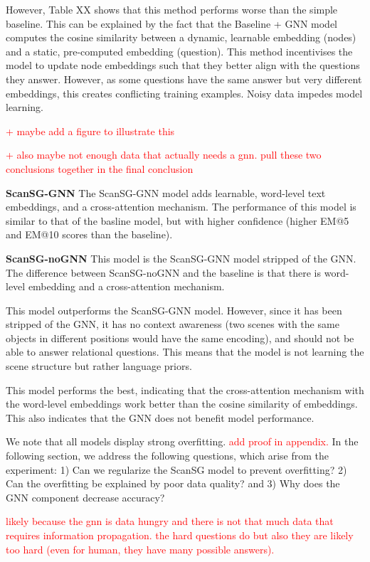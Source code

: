 However, Table XX shows that this method performs worse than the simple baseline. This can be explained by the fact that the Baseline + GNN model computes the cosine similarity between a dynamic, learnable embedding (nodes) and a static, pre-computed embedding (question). This method incentivises the model to update node embeddings such that they better align with the questions they answer. However, as some questions have the same answer but very different embeddings, this creates conflicting training examples. Noisy data impedes model learning.

\textcolor{red}{+ maybe add a figure to illustrate this}

\textcolor{red}{+ also maybe not enough data that actually needs a gnn. pull these two conclusions together in the final conclusion}

\bigskip \noindent
\textbf{ScanSG-GNN}
The ScanSG-GNN model adds learnable, word-level text embeddings, and a cross-attention mechanism. The performance of this model is similar to that of the basline model, but with higher confidence (higher EM@5 and EM@10 scores than the baseline).

\bigskip \noindent
\textbf{ScanSG-noGNN}
This model is the ScanSG-GNN model stripped of the GNN. The difference between ScanSG-noGNN and the baseline is that there is word-level embedding and a cross-attention mechanism.

This model outperforms the ScanSG-GNN model. However, since it has been stripped of the GNN, it has no context awareness (two scenes with the same objects in different positions would have the same encoding), and should not be able to answer relational questions. This means that the model is not learning the scene structure but rather language priors.

This model performs the best, indicating that the cross-attention mechanism with the word-level embeddings work better than the cosine similarity of embeddings. This also indicates that the GNN does not benefit model performance.

\bigskip
\noindent
We note that all models display strong overfitting. \textcolor{red}{add proof in appendix.}
In the following section, we address the following questions, which arise from the experiment: 1) Can we regularize the ScanSG model to prevent overfitting? 2) Can the overfitting be explained by poor data quality? and 3) Why does the GNN component decrease accuracy?

\textcolor{red}{likely because the gnn is data hungry and there is not that much data that requires information propagation. the hard questions do but also they are likely too hard (even for human, they have many possible answers).}


